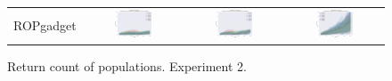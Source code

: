 \documentclass{article}
\begin{document}
\begin{landscape}
\begin{figure}[t]
\begin{center}
\begin{tabular}{c c c c}
    ROPgadget & \includegraphics[align=c,width=0.42\textwidth]{rc/e2/4} & \includegraphics[align=c,width=0.42\textwidth]{rc/e2/5} & \includegraphics[align=c,width=0.42\textwidth]{rc/e2/6} \\
\end{tabular}
\end{center}
\caption{Return count of populations. Experiment 2.}
\label{fig:rc/e2}
\end{figure}


\end{landscape}
\end{document}
